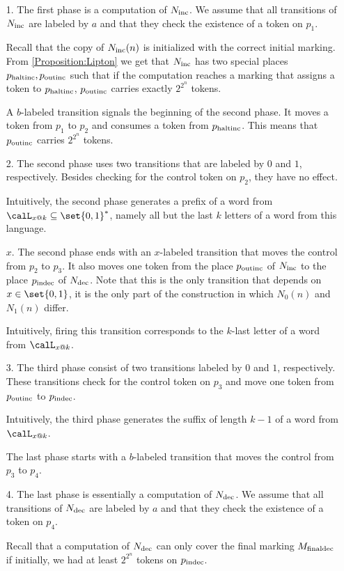 \documentclass[../../diss.tex]{subfiles}
\begin{document}
\begin{enumerate}
    \item[1.]
        The first phase is a computation of $N_{\text{inc}}$.
        We assume that all transitions of $N_{\text{inc}}$ are labeled by $a$ and that they check the existence of a token on $p_1$.

        Recall that the copy of $N_{\text{inc}}(n)$ is initialized with the correct initial marking.
        From \cref{Proposition:Lipton} we get that $N_{\text{inc}}$ has two special places $p_{\text{haltinc}}, p_{\text{outinc}}$ such that if the computation reaches a marking that assigns a token to $p_{\text{haltinc}}$, $p_{\text{outinc}}$ carries exactly $2^{2^n}$ tokens.
    \item[]
        A $b$-labeled transition signals the beginning of the second phase.
        It moves a token from $p_1$ to $p_2$ and consumes a token from $p_{\text{haltinc}}$.
        This means that $p_{\text{outinc}}$ carries $2^{2^n}$ tokens.
    \item[2.]
        The second phase uses two transitions that are labeled by $0$ and $1$, respectively.
        Besides checking for the control token on $p_2$, they have no effect.

        Intuitively, the second phase generates a prefix of a word from $\calL_{x @ k} \subseteq \set{0,1}^*$, namely all but the last $k$ letters of a word from this language.
    \item[$x$.]
        The second phase ends with an $x$-labeled transition that moves the control from $p_2$ to $p_3$.
        It also moves one token from the place $p_{\text{outinc}}$ of $N_{\text{inc}}$ to the place $p_{\text{indec}}$ of $N_{\text{dec}}$.
%
        Note that this is the only transition that depends on $x \in \set{0,1}$, \ie it is the only part of the construction in which $N_0(n)$ and $N_1(n)$ differ.

        Intuitively, firing this transition corresponds to the $k$-last letter of a word from $\calL_{x @ k}$.
    \item[3.]
        The third phase consist of two transitions labeled by $0$ and $1$, respectively.
        These transitions check for the control token on $p_3$ and move one token from $p_{\text{outinc}}$ to $p_{\text{indec}}$.

        Intuitively, the third phase generates the suffix of length $k-1$ of a word from $\calL_{x @ k}$.
    \item[]
        The last phase starts with a $b$-labeled transition that moves the control from $p_3$ to $p_4$.
    \item[4.]
        The last phase is essentially a computation of $N_{\text{dec}}$.
        We assume that all transitions of $N_{\text{dec}}$ are labeled by $a$ and that they check the existence of a token on $p_4$.

        Recall that a computation of $N_{\text{dec}}$ can only cover the final marking $M_{{\text{final}}{\text{dec}}}$ if initially, we had at least $2^{2^n}$ tokens on $p_{\text{indec}}$.
\end{enumerate}
\end{document}
